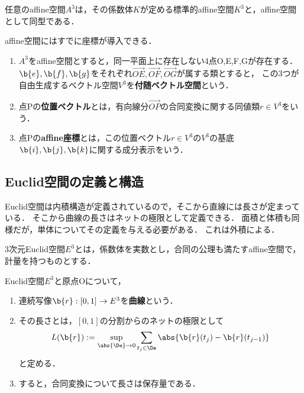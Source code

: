 \documentclass[uplatex,dvipdfmx]{jsreport}
\begin{document}
\begin{theorem}
    任意のaffine空間$A^3$は，その係数体$K$が定める標準的affine空間$K^3$と，affine空間として同型である．
\end{theorem}

\begin{definition}[affine座標]
    affine空間にはすでに座標が導入できる．
    \begin{enumerate}
        \item $A^3$をaffine空間とすると，同一平面上に存在しない4点O,E,F,Gが存在する．
        $\b{e},\b{f},\b{g}$をそれぞれ$\Vec{OE},\Vec{OF},\Vec{OG}$が属する類とすると，
        この3つが自由生成するベクトル空間$V^3$を\textbf{付随ベクトル空間}という．
        \item 点Pの\textbf{位置ベクトル}とは，有向線分$\Vec{OP}$の合同変換に関する同値類$r\in V^3$をいう．
        \item 点Pの\textbf{affine座標}とは，この位置ベクトル$r\in V^3$の$V^3$の基底$\b{i},\b{j},\b{k}$に関する成分表示をいう．
    \end{enumerate}
\end{definition}

\subsection{Euclid空間の定義と構造}

\begin{tcolorbox}[colframe=ForestGreen, colback=ForestGreen!10!white,breakable,colbacktitle=ForestGreen!40!white,coltitle=black,fonttitle=\bfseries\sffamily,
    title=]
    Euclid空間は内積構造が定義されているので，そこから直線には長さが定まっている．
    そこから曲線の長さはネットの極限として定義できる．
    面積と体積も同様だが，単体についてその定義を与える必要がある．
    これは外積による．
\end{tcolorbox}

\begin{definition}
    3次元Euclid空間$E^3$とは，係数体を実数とし，合同の公理も満たすaffine空間で，計量を持つものとする．
\end{definition}

\begin{definition}[曲線の長さ]
    Euclid空間$E^3$と原点Oについて，
    \begin{enumerate}
        \item 連続写像$\b{r}:[0,1]\to E^3$を\textbf{曲線}という．
        \item その長さとは，$[0,1]$の分割からのネットの極限として
        \[L(\b{r}):=\sup_{\abs{\De}\to0}\sum_{t_j\in\De}\abs{\b{r}(t_j)-\b{r}(t_{j-1})}\]
        と定める．
        \item すると，合同変換について長さは保存量である．
    \end{enumerate}
\end{definition}
\end{document}
